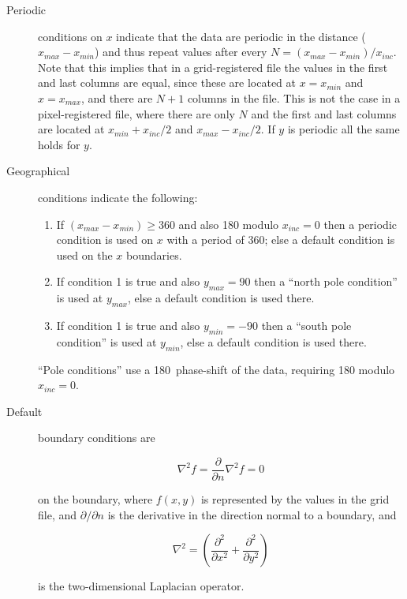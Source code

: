 \begin{description}

\item[Periodic] conditions on $x$ indicate that the data are
periodic in the distance ($x_{max} - x_{min}$) and thus repeat
values after every $N = (x_{max} - x_{min})/x_{inc}$.  Note that
this implies that in a grid-registered file the values in the first
and last columns are equal, since these are located at $x = x_{min}$
and $x = x_{max}$, and there are $N + 1$ columns in the file.
This is not the case in a pixel-registered file, where there are only
$N$ and the first and last columns are located at
$x_{min} + x_{inc}/2$ and $x_{max} - x_{inc}/2$.  If $y$ is
periodic all the same holds for $y$.

\item[Geographical] conditions indicate the following:

\begin{enumerate}

\item If $(x_{max} - x_{min}) \geq 360$ and also 180 modulo $x_{inc} = 0$
then a periodic condition is used on $x$ with a period of 360;
else a default condition is used on the $x$ boundaries.

\item If condition 1 is true and also $y_{max} = 90$ then a
``north pole condition'' is used at $y_{max}$, else a default
condition is used there.

\item If condition 1 is true and also $y_{min} = -90$ then a
``south pole condition'' is used at $y_{min}$, else a default
condition is used there.

\end{enumerate}

``Pole conditions'' use a 180\DS\ phase-shift of the data,
requiring 180 modulo $x_{inc} = 0$.

\item[Default] boundary conditions are

\[ \nabla^2 f = \frac{\partial}{\partial n} \nabla^2 f = 0 \]

on the boundary, where $f(x, y)$ is represented by the values in
the grid file, and $\partial/\partial n$ is the derivative in the direction normal to a
boundary, and

\[ \nabla^2 = \left(\frac{\partial^2}{\partial x^2} + \frac{\partial^2}{\partial y^2}\right) \]

is the two-dimensional Laplacian operator.

\end{description}

